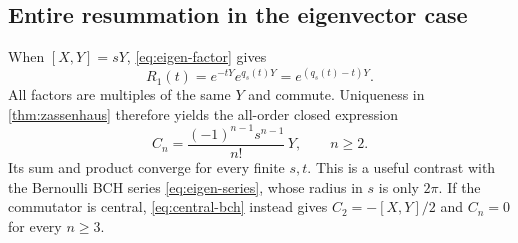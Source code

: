 \subsection{Entire resummation in the eigenvector case}
When $[X,Y]=sY$, \cref{eq:eigen-factor} gives
\[
 R_1(t)=e^{-tY}e^{q_s(t)Y}=e^{(q_s(t)-t)Y}.
\]
All factors are multiples of the same $Y$ and commute. Uniqueness in \cref{thm:zassenhaus} therefore yields the all-order closed expression
\begin{equation}\label{eq:eigen-zassenhaus}
 \boxed{\displaystyle C_n=\frac{(-1)^{n-1}s^{n-1}}{n!}\,Y,
 \qquad n\geq2.}
\end{equation}
Its sum and product converge for every finite $s,t$. This is a useful contrast with the Bernoulli BCH series \cref{eq:eigen-series}, whose radius in $s$ is only $2\pi$. If the commutator is central, \cref{eq:central-bch} instead gives $C_2=-[X,Y]/2$ and $C_n=0$ for every $n\geq3$.
